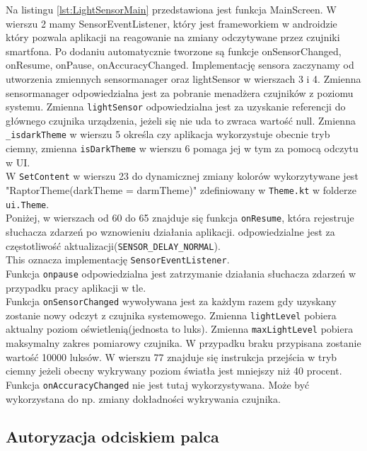 Na listingu \ref{lst:LightSensorMain} przedstawiona jest funkcja MainScreen. W wierszu 2 mamy SensorEventListener, który jest frameworkiem w androidzie który pozwala aplikacji na reagowanie na zmiany odczytywane przez czujniki smartfona. Po dodaniu automatycznie tworzone są funkcje onSensorChanged, onResume, onPause, onAccuracyChanged.
Implementację sensora zaczynamy od utworzenia zmiennych sensormanager oraz lightSensor w wierszach 3 i 4. Zmienna sensormanager odpowiedzialna jest za pobranie menadżera czujników z poziomu systemu.
Zmienna \texttt{lightSensor} odpowiedzialna jest za uzyskanie referencji do głównego czujnika urządzenia, jeżeli się nie uda to zwraca wartość null.
Zmienna \texttt{\_isdarkTheme} w wierszu 5 określa czy aplikacja wykorzystuje obecnie tryb ciemny, zmienna \texttt{isDarkTheme} w wierszu 6 pomaga jej w tym za pomocą odczytu w UI.
\\
W \texttt{SetContent} w wierszu 23 do dynamicznej zmiany kolorów wykorzytywane jest "RaptorTheme(darkTheme = darmTheme)" zdefiniowany w \texttt{Theme.kt} w folderze \texttt{ui.Theme}.
\\
Poniżej, w wierszach od 60 do 65 znajduje się funkcja \texttt{onResume}, która rejestruje słuchacza zdarzeń po wznowieniu działania aplikacji. odpowiedzialne jest za częstotliwość aktualizacji(\texttt{SENSOR\_DELAY\_NORMAL}).
\\
This oznacza implementację \texttt{SensorEventListener}.
\\
Funkcja \texttt{onpause} odpowiedzialna jest zatrzymanie działania słuchacza zdarzeń w przypadku pracy aplikacji w tle.
\\
Funkcja \texttt{onSensorChanged} wywoływana jest za każdym razem gdy uzyskany zostanie nowy odczyt z czujnika systemowego.
Zmienna \texttt{lightLevel} pobiera aktualny poziom oświetlenią(jednosta to luks).
Zmienna \texttt{maxLightLevel} pobiera maksymalny zakres pomiarowy czujnika. W przypadku braku przypisana zostanie wartość 10000 luksów. 
W wierszu 77 znajduje się instrukcja przejścia w tryb ciemny jeżeli obecny wykrywany poziom światła jest mniejszy niż 40 procent.
Funkcja \texttt{onAccuracyChanged} nie jest tutaj wykorzystywana. Może być wykorzystana do np. zmiany dokładności wykrywania czujnika.
\\


\subsection{Autoryzacja odciskiem palca}

